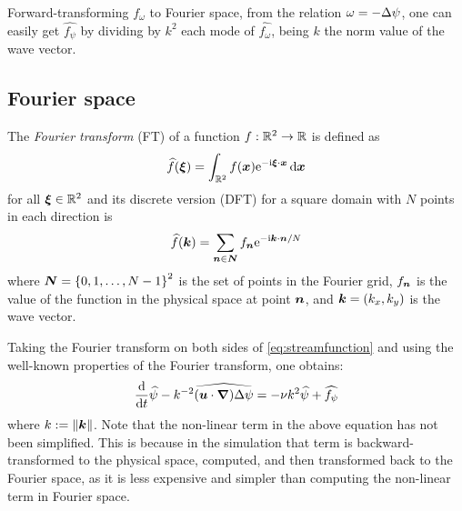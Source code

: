\documentclass[../main.tex]{subfiles}
\begin{document}
Forward-transforming $f_\omega$ to Fourier space, from the relation $\omega = -\Delta \psi$, one can easily get $\widehat{f_\psi}$ by dividing by $k^2$ each mode of $\widehat{f_\omega}$, being $k$ the norm value of the wave vector.

\subsection{Fourier space}
The \emph{Fourier transform} (FT) of a function $f:\mathbb{R}^2 \to \mathbb{R}$ is defined as
\begin{equation}
	\widehat{f}(\boldsymbol{\xi}) = \int_{\mathbb{R}^2} f(\boldsymbol{x}) \mathrm{e}^{-\mathrm{i} \boldsymbol{\xi} \cdot \boldsymbol{x}} \dd{\boldsymbol{x}}
\end{equation}
for all $\boldsymbol{\xi}\in\mathbb{R}^2$ and its discrete version (DFT) for a square domain with $N$ points in each direction is
\begin{equation}
	\widehat{f}(\boldsymbol{k}) = \sum_{\boldsymbol{n}\in\boldsymbol{N}} f_{\boldsymbol{n}} \mathrm{e}^{-\mathrm{i} \boldsymbol{k} \cdot \boldsymbol{n} / N}
\end{equation}
where $\boldsymbol{N} = {\{0,1,\ldots,N-1\}}^2$ is the set of points in the Fourier grid, $f_{\boldsymbol{n}}$ is the value of the function in the physical space at point $\boldsymbol{n}$, and $\boldsymbol{k} = (k_x,k_y)$ is the wave vector.

Taking the Fourier transform on both sides of \cref{eq:streamfunction} and using the well-known properties of the Fourier transform, one obtains:
\begin{equation}\label{eq:streamfunction_fourier}
	\dv{}{t}\widehat{\psi} - k^{-2} \widehat{(\boldsymbol{u}\cdot \grad) \Delta \psi}= -\nu k^2 \widehat{\psi} + \widehat{f_\psi}
\end{equation}
where $k:=\left\|\boldsymbol{k}\right\|$. Note that the non-linear term in the above equation has not been simplified. This is because in the simulation that term is backward-transformed to the physical space, computed, and then transformed back to the Fourier space, as it is less expensive and simpler than computing the non-linear term in Fourier space.
\end{document}

